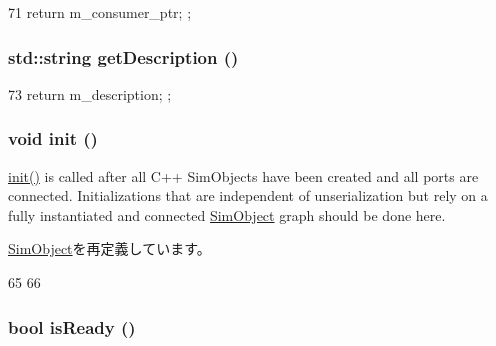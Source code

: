 \begin{DoxyCode}
71 { return m_consumer_ptr; };
\end{DoxyCode}
\hypertarget{classWireBuffer_a73da75c3e5ec30855a02eae2ba824e38}{
\subsubsection[{getDescription}]{\setlength{\rightskip}{0pt plus 5cm}std::string getDescription ()}}
\label{classWireBuffer_a73da75c3e5ec30855a02eae2ba824e38}



\begin{DoxyCode}
73 { return m_description; };
\end{DoxyCode}
\hypertarget{classWireBuffer_a02fd73d861ef2e4aabb38c0c9ff82947}{
\subsubsection[{init}]{\setlength{\rightskip}{0pt plus 5cm}void init ()}}
\label{classWireBuffer_a02fd73d861ef2e4aabb38c0c9ff82947}
\hyperlink{classWireBuffer_a02fd73d861ef2e4aabb38c0c9ff82947}{init()} is called after all C++ SimObjects have been created and all ports are connected. Initializations that are independent of unserialization but rely on a fully instantiated and connected \hyperlink{classSimObject}{SimObject} graph should be done here. 

\hyperlink{classSimObject_a02fd73d861ef2e4aabb38c0c9ff82947}{SimObject}を再定義しています。


\begin{DoxyCode}
65 {
66 }
\end{DoxyCode}
\hypertarget{classWireBuffer_acbed040576a7a18e2d9c46b2f15e0162}{
\subsubsection[{isReady}]{\setlength{\rightskip}{0pt plus 5cm}bool isReady ()}}
\label{classWireBuffer_acbed040576a7a18e2d9c46b2f15e0162}



